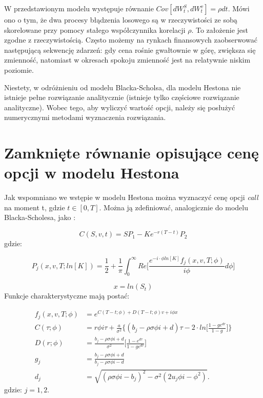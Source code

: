 \documentclass{pracamgr}
\begin{document}
W przedstawionym modelu występuje równanie $Cov[dW^S_t, dW^v_t] = \rho dt $. Mówi ono o tym, że 
dwa procesy błądzenia losowego są w rzeczywistości ze sobą skorelowane przy pomocy stałego 
współczynnika korelacji $\rho$.
To założenie jest zgodne z rzeczywistością. Często możemy na rynkach finansowych zaobserwować 
następującą sekwencję zdarzeń: gdy cena rośnie gwałtownie w górę, zwiększa się zmienność, 
natomiast w okresach spokoju zmienność jest na relatywnie niskim poziomie.

Niestety, w odróżnieniu od modelu Blacka-Scholsa, dla modelu Hestona nie istnieje pełne rozwiązanie 
analitycznie (istnieje tylko częściowe rozwiązanie analityczne). Wobec tego, aby 
wyliczyć wartość opcji, należy się posłużyć numerycznymi metodami wyznaczenia rozwiązania.


\section{Zamknięte równanie opisujące cenę opcji w modelu Hestona}



Jak wspomniano we wstępie w modelu Hestona można wyznaczyć cenę opcji \textit{call} na moment t, 
gdzie $t \in [0, T]$. Można ją zdefiniować, analogicznie do modelu Blacka-Scholesa, jako 
\cite{Heston}:

\begin{equation}
  C(S, v, t) = SP_1 -K e^{-r(T-t)} P_2
\end{equation}
gdzie:

\begin{equation}
\label{eq:HestonProb}
  P_j (x, v, T; ln[K]) = \frac{1}{2} + \frac{1}{\pi} \int_{0}^{\infty} Re \bigg[ \frac{e^{-i \cdot \phi ln[K]} f_j(x, v, T; \phi) }{i \phi} d \phi \bigg]
\end{equation}

\begin{equation}
  x = ln(S_t)
\end{equation}
Funkcje charakterystyczne mają postać: 

\begin{equation}
\label{eq:HestonCharacteristic}
  \begin{aligned}
f_j(x, v, T; \phi) &= e^{C(T-t; \phi) + D(T-t; \phi)v + i \phi x} \\
C (\tau; \phi)     &= r \phi i \tau + \frac{a}{\sigma^2} \bigg\{ (b_j - \rho \sigma \phi i + d) \tau - 2 \cdot ln \bigg[ \frac{1 - ge^{dr}}{1-g} \bigg] \bigg\} \\
D (r; \phi)        &= \frac{b_j- \rho \sigma \phi i + d}{\sigma^2} \bigg[ \frac{1 - e^{d\tau}}{1 - ge^{d\tau}} \bigg]   \\
g_j                &= \frac{b_j - \rho \sigma \phi i + d}{b_j - \rho \sigma \phi i - d} \\
d_j                &= \sqrt{(\rho \sigma \phi i  - b_j)^2 - \sigma^2(2 u_j \phi  i  - \phi^2)}.
  \end{aligned}
\end{equation}
gdzie: $j = 1,2$.
\end{document}
